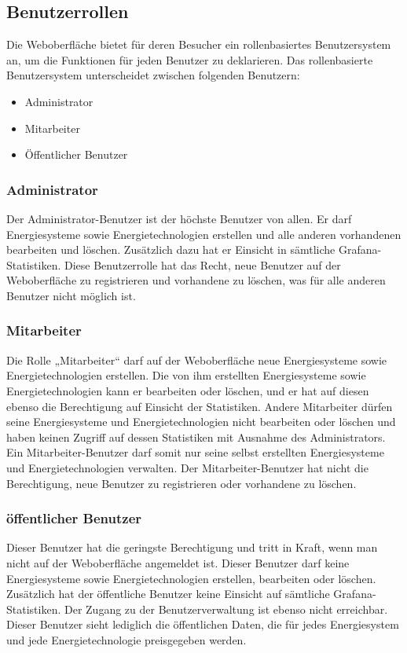 \subsection{Benutzerrollen}
Die Weboberfläche bietet für deren Besucher ein rollenbasiertes Benutzersystem an, um die Funktionen für jeden Benutzer zu deklarieren.
Das rollenbasierte Benutzersystem unterscheidet zwischen folgenden Benutzern:

\begin{itemize}
	\item Administrator 
	\item Mitarbeiter
	\item Öffentlicher Benutzer 
\end{itemize}



\subsubsection{Administrator}
Der Administrator-Benutzer ist der höchste Benutzer von allen. Er darf Energiesysteme sowie Energietechnologien erstellen und alle anderen vorhandenen bearbeiten und löschen. Zusätzlich dazu hat er Einsicht in sämtliche Grafana-Statistiken. Diese Benutzerrolle hat das Recht, neue Benutzer auf der Weboberfläche zu registrieren und vorhandene zu löschen, was für alle anderen Benutzer nicht möglich ist.

\subsubsection{Mitarbeiter}
Die Rolle „Mitarbeiter“ darf auf der Weboberfläche neue Energiesysteme sowie Energietechnologien erstellen. Die von ihm erstellten Energiesysteme sowie Energietechnologien kann er bearbeiten oder  löschen, und er hat auf diesen ebenso die Berechtigung auf Einsicht der Statistiken. Andere Mitarbeiter dürfen seine Energiesysteme und Energietechnologien nicht bearbeiten oder löschen und haben keinen Zugriff auf dessen Statistiken mit Ausnahme des Administrators. Ein Mitarbeiter-Benutzer darf somit nur seine selbst erstellten Energiesysteme und Energietechnologien verwalten. Der Mitarbeiter-Benutzer hat nicht die Berechtigung, neue Benutzer zu registrieren oder vorhandene zu löschen.

\subsubsection{öffentlicher Benutzer}
Dieser Benutzer hat die geringste Berechtigung und tritt in Kraft, wenn man nicht auf der Weboberfläche angemeldet ist. Dieser Benutzer darf keine Energiesysteme sowie Energietechnologien erstellen, bearbeiten oder löschen. Zusätzlich hat der öffentliche Benutzer keine Einsicht auf sämtliche Grafana-Statistiken. Der Zugang zu der Benutzerverwaltung ist ebenso nicht erreichbar. Dieser Benutzer sieht lediglich die öffentlichen Daten, die für jedes Energiesystem und jede Energietechnologie preisgegeben werden.

